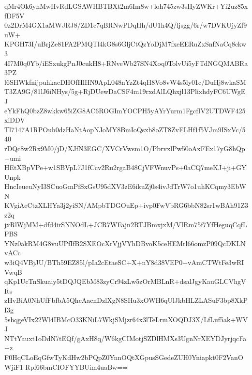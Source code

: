 qMr4Ok6ynMwHvRdLGSAWHBTBXt2m6Im8w+loh745zw3sHyZWKr+Yi2uz85xfDF5V
0z2DrM4GX1aMWJRJ8/ZD1c7qBRNwPDqHh/dU1h4Q/ljsgg/6r/w7DVKUjyZf9uW+
KPGH73I/uBrjZe81FA2PMQTl4kG8s6GljCtQzYoDjM7fxeEERuZxSnfNaCq8ckw3
4I7M0q0Yb/iESxukgPnJ0cukH8+RNveWb27SN4Xoq0TolvUi5yFTdNGQMABRa3PZ
l6SHWkfnijpuhkacDHOfHlHN9ApL048nYzZt4qH8Vo8vW4s5ly01c/DuHj8wkaSM
T3ZA9G/81lJ6iNHys/5g+RjDUewDaCSF4m19rxdAlLQhxjl13PlixhdyFC6UWgEJ
eYkFhQ0bzZ8wkkw65iZG8AC6ROGImYOCPH5yAYrYurm1FgcfIV2UTDWF425xiDDV
Tl7147A1RPOuh0dzHaNtAopNJoMY8BmIoQsxb8oZT8ZvELHf1f5VJm9ISxVc/540
rDQc8w2Rx9M0/jD/XJfN3EGC/XVCrVwsm1O/PbrvxlPw50oAxFEx17yG8hQp+umi
HEtXBpVPe+w1SBVpL7J1fCcv2Ru2rgaB48CjVFWnuvPs+0aCQ7meKJ+ji+GYUnpk
HncIeueuNyI3SCuoGmPfSxGsU95dXV3zE6ikuZj0s4ivJdTrW7o1uhKCqmy3EbWN
KVgiAeCtzXLHYa3j2yiSN/AMpbTDGOuEp+ivp0FwVbRG6bbN82sr1wBAh91Z3z2q
jxRlWjMM+dfd4irSNNOdL+JCR7WFajn2RTJBmxjxM/VIRm75f7YfHeguqCqfLPBS
YNz0akRM4G8vuUPfIfB2SXEOcXrVjjVYhDBvoK5ceHEMrl66omzP09QcDKLNvACc
w3iQ4VBjJU/BTh59EZ85l/pIa2cEtaeSC+X+nY8d38VEP0+vAmCTWtFe3wRIVwqB
qKp1UcTnSkuaiy5tDQJQEbM83zyCr94zLw5zOrMBLnR+dsalJgyKauGLCVhgVIts
zHvBiA0NhUfFbfbA5QhcAacnDzlXgN8SHu3xOWH6qUlJkbHLZLASuF3bp8XkPI3g
5shqgeVIx22Wl4IBMcO33KNiL7WkjSMjzr64x3lTeLrmXOQDJ3X/LfLuf5ak+WVJ
NTtYauxt1oDdN7tEQf/gAxH8q/W6kgCIMotjSZDlHMXs3UgnNrXEYDJyrjqcFa+z
F0HqCLoEqGfwTyKdHw2bPQpZ0YnnOQtXGpusSGedeZUH0Yniapkt0F2VanOWjiF1
Rpf66bmCIOFYYBUim4uaBw==
